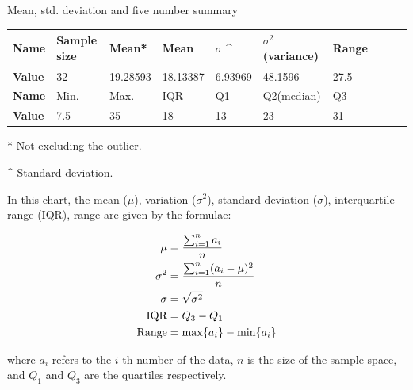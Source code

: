 \documentclass[a4paper]{article}
\begin{document}
\begin{center}
    \begin{threeparttable}[b]
        \centering
        \caption{Mean, std. deviation and five number summary}
        \label{tab.onevar}
        \begin{tabular}{llllllllll}
            \hline
            \textbf{Name}  & Sample size & Mean*    & Mean     & $\sigma$ \^{} & $\sigma^2$ (variance) & Range & \\ \hline
            \textbf{Value} & 32 & 19.28593 & 18.13387 & 6.93969 & 48.1596 &  27.5 & \\ \hline
            \textbf{Name} & Min. & Max. & IQR & Q1 & Q2(median) & Q3 \\ \hline
            \textbf{Value} & 7.5  & 35   & 18  & 13   & 23           & 31   \\ \hline
    
        \end{tabular}
        \begin{tablenotes}
        \footnotesize
        \item[*] Not excluding the outlier.
        \item[\^{}] Standard deviation.
        \end{tablenotes}
    \end{threeparttable}
    
\end{center}

In this chart, the mean ($\mu$), variation ($\sigma^2$), standard deviation ($\sigma$), interquartile range (IQR), range are given by the formulae:

\begin{equation*}
    \begin{aligned}
        \mu &= {{\sum_{i=1}^n a_i}\over n} \\
        \sigma^2 &= {{\sum_{i=1}^n (a_i-\mu)^2}\over n} \\
        \sigma &= \sqrt{\sigma^2}  \\
        \text{IQR} &= Q_3 - Q_1 \\
        \text{Range} &= \max\{a_i\} - \min\{a_i\} \\
    \end{aligned}
\end{equation*}

where $a_i$ refers to the $i$-th number of the data, $n$ is the size of the sample space, and $Q_1$ and $Q_3$ are the quartiles respectively.
\end{document}
